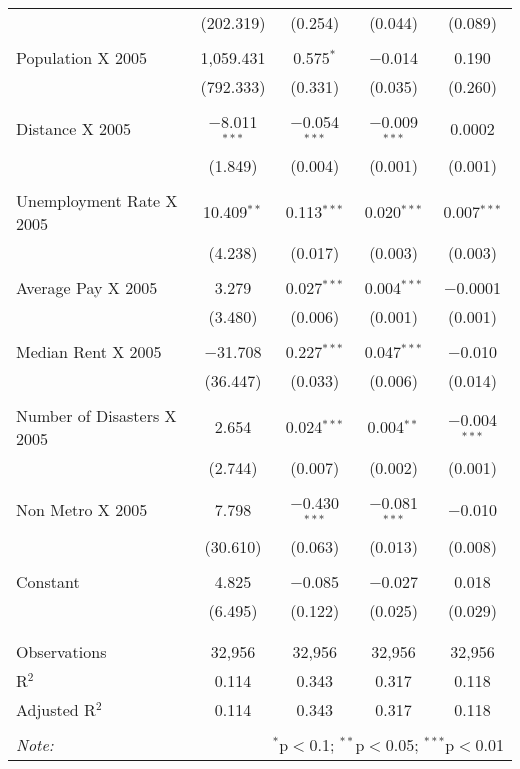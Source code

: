 \documentclass[]{article}
\begin{document}
\begin{table}[!htbp]
\begin{tabular}{@{\extracolsep{5pt}}lcccc}
  & (202.319) & (0.254) & (0.044) & (0.089) \\ 
  & & & & \\ 
 Population X 2005 & 1,059.431 & 0.575$^{*}$ & $-$0.014 & 0.190 \\ 
  & (792.333) & (0.331) & (0.035) & (0.260) \\ 
  & & & & \\ 
 Distance X 2005 & $-$8.011$^{***}$ & $-$0.054$^{***}$ & $-$0.009$^{***}$ & 0.0002 \\ 
  & (1.849) & (0.004) & (0.001) & (0.001) \\ 
  & & & & \\ 
 Unemployment Rate X 2005  & 10.409$^{**}$ & 0.113$^{***}$ & 0.020$^{***}$ & 0.007$^{***}$ \\ 
  & (4.238) & (0.017) & (0.003) & (0.003) \\ 
  & & & & \\ 
 Average Pay X 2005 & 3.279 & 0.027$^{***}$ & 0.004$^{***}$ & $-$0.0001 \\ 
  & (3.480) & (0.006) & (0.001) & (0.001) \\ 
  & & & & \\ 
 Median Rent X 2005 & $-$31.708 & 0.227$^{***}$ & 0.047$^{***}$ & $-$0.010 \\ 
  & (36.447) & (0.033) & (0.006) & (0.014) \\ 
  & & & & \\ 
 Number of Disasters X 2005 & 2.654 & 0.024$^{***}$ & 0.004$^{**}$ & $-$0.004$^{***}$ \\ 
  & (2.744) & (0.007) & (0.002) & (0.001) \\ 
  & & & & \\ 
 Non Metro X 2005 & 7.798 & $-$0.430$^{***}$ & $-$0.081$^{***}$ & $-$0.010 \\ 
  & (30.610) & (0.063) & (0.013) & (0.008) \\ 
  & & & & \\ 
 Constant & 4.825 & $-$0.085 & $-$0.027 & 0.018 \\ 
  & (6.495) & (0.122) & (0.025) & (0.029) \\ 
  & & & & \\ 
\hline \\[-1.8ex] 
Observations & 32,956 & 32,956 & 32,956 & 32,956 \\ 
R$^{2}$ & 0.114 & 0.343 & 0.317 & 0.118 \\ 
Adjusted R$^{2}$ & 0.114 & 0.343 & 0.317 & 0.118 \\ 
\hline 
\hline \\[-1.8ex] 
\textit{Note:}  & \multicolumn{4}{r}{$^{*}$p$<$0.1; $^{**}$p$<$0.05; $^{***}$p$<$0.01} \\ 
\end{tabular} 
\end{table}
\end{document}
